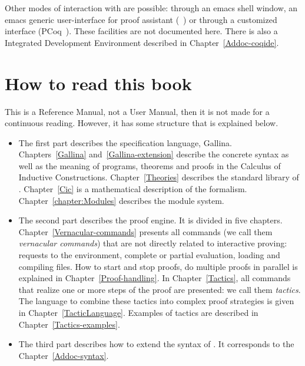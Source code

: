 Other modes of interaction with \Coq{} are possible: through an emacs
shell window, an emacs generic user-interface for proof assistant
({\ProofGeneral}~\cite{ProofGeneral}) or through a customized interface
(PCoq~\cite{Pcoq}).  These facilities are not documented here.  There
is also a \Coq{} Integrated Development Environment described in
Chapter~\ref{Addoc-coqide}.

\section*{How to read this book}

This is a Reference Manual, not a User Manual, then it is not made for a
continuous reading. However, it has some structure that is explained
below.

\begin{itemize}
\item The first part describes the specification language,
  Gallina. Chapters~\ref{Gallina} and~\ref{Gallina-extension}
  describe the concrete syntax as well as the meaning of programs,
  theorems and proofs in the Calculus of Inductive
  Constructions. Chapter~\ref{Theories} describes the standard library
  of \Coq. Chapter~\ref{Cic} is a mathematical description of the
  formalism. Chapter~\ref{chapter:Modules} describes the module system.

\item The second part describes the proof engine. It is divided in
  five chapters. Chapter~\ref{Vernacular-commands} presents all
  commands (we call them \emph{vernacular commands}) that are not
  directly related to interactive proving: requests to the
  environment, complete or partial evaluation, loading and compiling
  files. How to start and stop proofs, do multiple proofs in parallel
  is explained in Chapter~\ref{Proof-handling}. In
  Chapter~\ref{Tactics}, all commands that realize one or more steps
  of the proof are presented: we call them \emph{tactics}. The
  language to combine these tactics into complex proof strategies is
  given in Chapter~\ref{TacticLanguage}. Examples of tactics are
  described in Chapter~\ref{Tactics-examples}.


\item The third part describes how to extend the syntax of \Coq. It
corresponds to the Chapter~\ref{Addoc-syntax}.


\end{itemize}
